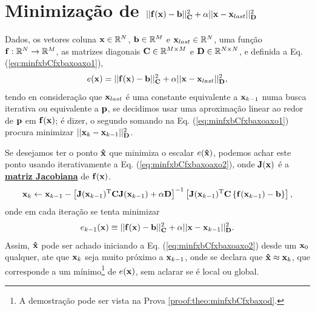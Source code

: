 \section{Minimização de $||\VECTOR{f}(\VECTOR{x})-\VECTOR{b}||_{\MATRIX{C}}^2+\alpha||\VECTOR{x}-\VECTOR{x}_{last}||_{\MATRIX{D}}^2$}



\begin{theorem}\label{theo:minfxbCfxbaxoaxo}
Dados,
os vetores coluna $\VECTOR{x}\in \mathbb{R}^N$, $\VECTOR{b}\in \mathbb{R}^M$ e $\VECTOR{x}_{last}\in \mathbb{R}^N$,  
uma função $\VECTOR{f}:\mathbb{R}^{N} \rightarrow \mathbb{R}^{M}$, 
as matrizes diagonais $\MATRIX{C} \in \mathbb{R}^{M\times M}$ e $\MATRIX{D} \in \mathbb{R}^{N\times N}$, e 
definida a Eq. (\ref{eq:minfxbCfxbaxoaxo1}),
\begin{equation}\label{eq:minfxbCfxbaxoaxo1}
e(\VECTOR{x})=||\VECTOR{f}(\VECTOR{x})-\VECTOR{b}||_{\MATRIX{C}}^2+\alpha||\VECTOR{x}-\VECTOR{x}_{last}||_{\MATRIX{D}}^2,
\end{equation}
tendo en consideração que $\VECTOR{x}_{last}$ é uma constante equivalente a $\VECTOR{x}_{k-1}$
numa busca iterativa ou equivalente a $\VECTOR{p}$, 
se decidimos usar uma aproximação linear ao redor de $\VECTOR{p}$ em $\VECTOR{f}(\VECTOR{x})$; 
é dizer, o segundo somando na Eq. (\ref{eq:minfxbCfxbaxoaxo1}) 
procura minimizar $||\VECTOR{x}_{k}-\VECTOR{x}_{k-1}||_{\MATRIX{D}}^2$.


Se desejamos ter o ponto $\VECTOR{\hat{x}}$ que minimiza o escalar $e(\VECTOR{\hat{x}})$,
podemos achar este ponto usando iterativamente a Eq. (\ref{eq:minfxbCfxbaxoaxo2}),
onde  $\MATRIX{J}(\VECTOR{x})$ é a \hyperref[def:jacobian]{\textbf{matriz Jacobiana}}  de $\VECTOR{f}(\VECTOR{x})$.
\begin{equation}\label{eq:minfxbCfxbaxoaxo2}
\VECTOR{x}_{k}\leftarrow \VECTOR{x}_{k-1}-
\left[ \MATRIX{J}(\VECTOR{x}_{k-1})^{\transpose}\MATRIX{C} \MATRIX{J}(\VECTOR{x}_{k-1}) +\alpha\MATRIX{D} \right]^{-1}
 \left[\MATRIX{J}(\VECTOR{x}_{k-1})^{\transpose}\MATRIX{C}\left\{\VECTOR{f}(\VECTOR{x}_{k-1})-\VECTOR{b}\right\}\right],
\end{equation}
onde em cada iteração se tenta minimizar
\begin{equation}\label{eq:minfxbCfxbaxoaxo2:ex}
e_{k-1}(\VECTOR{x})  \equiv 
||\VECTOR{f}(\VECTOR{x})-\VECTOR{b}||_{\MATRIX{C}}^2+
\alpha||\VECTOR{x}-\VECTOR{x}_{k-1}||_{\MATRIX{D}}^2.
\end{equation}
Assim, $\VECTOR{\hat{x}}$ pode ser achado 
iniciando a Eq. (\ref{eq:minfxbCfxbaxoaxo2}) desde um $\VECTOR{x}_{0}$ qualquer, 
ate que $\VECTOR{x}_{k}$ seja muito próximo a $\VECTOR{x}_{k-1}$,
onde se declara que $\VECTOR{\hat{x}} \approx \VECTOR{x}_{k}$,
que corresponde a um mínimo\footnote{\label{ref:minfxxp}A
demostração pode ser vista na Prova \ref{proof:theo:minfxbCfxbaxod}.} de $e(\VECTOR{x})$,
sem aclarar se é local ou global.



\end{theorem}
